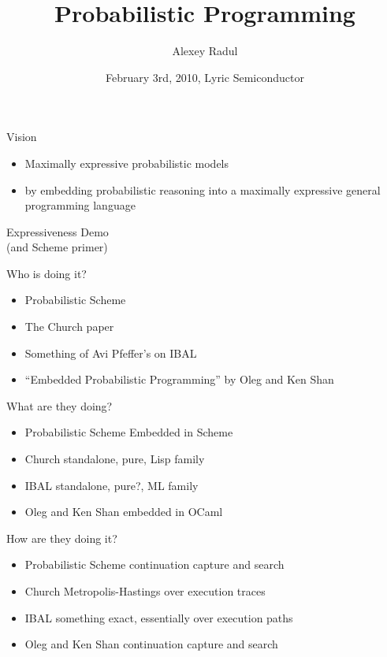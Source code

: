 \documentclass{beamer}
\title[Probabilistic Programming]{Probabilistic Programming}
\author{Alexey Radul}
\date{February 3rd, 2010, Lyric Semiconductor}
\newcommand{\wordslide}[1]{\begin{frame}\begin{center}\Huge {#1}\end{center}\end{frame}}
\begin{document}
\begin{frame}
\maketitle
\end{frame}

\begin{frame}
\begin{center}\Huge Vision\end{center}
\begin{itemize}
\item Maximally expressive probabilistic models
\pause
\item by embedding probabilistic reasoning into a maximally expressive general
programming language
\end{itemize}
\end{frame}

\wordslide{Expressiveness Demo\\ \small (and Scheme primer)}

\begin{frame}
\begin{center}\Huge Who is doing it?\end{center}
\begin{itemize}
\item Probabilistic Scheme
\item The Church paper
\item Something of Avi Pfeffer's on IBAL
\item ``Embedded Probabilistic Programming'' by Oleg and Ken Shan
\end{itemize}
\end{frame}

\begin{frame}
\begin{center}\Huge What are they doing?\end{center}
\begin{itemize}
\item Probabilistic Scheme Embedded in Scheme
\item Church standalone, pure, Lisp family
\item IBAL standalone, pure?, ML family
\item Oleg and Ken Shan embedded in OCaml
\end{itemize}
\end{frame}

\begin{frame}
\begin{center}\Huge How are they doing it?\end{center}
\begin{itemize}
\item Probabilistic Scheme continuation capture and search
\item Church Metropolis-Hastings over execution traces
\item IBAL something exact, essentially over execution paths
\item Oleg and Ken Shan continuation capture and search
\end{itemize}
\end{frame}
\end{document}
